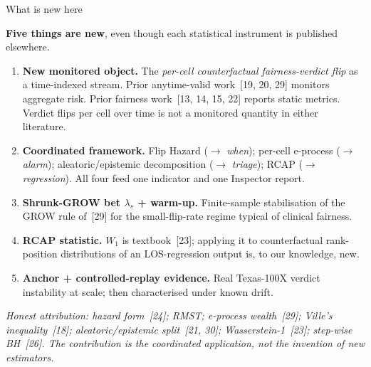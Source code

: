 \documentclass[aspectratio=169,11pt]{beamer}
\begin{document}
\begin{frame}{What is new here}
\vspace{-4pt}
\begin{teabox}[colframe=emerald]
\textbf{\color{emerald}\enspace Five things are new}, even though each statistical instrument is published elsewhere.
\end{teabox}
\vspace{-2pt}
\footnotesize
\begin{enumerate}\setlength\itemsep{1pt}
\item \textbf{New monitored object.} The \emph{per-cell counterfactual fairness-verdict flip} as a time-indexed stream. Prior anytime-valid work~[19, 20, 29] monitors aggregate risk. Prior fairness work~[13, 14, 15, 22] reports static metrics. Verdict flips per cell over time is not a monitored quantity in either literature.
\item \textbf{Coordinated framework.} Flip Hazard ($\rightarrow$ \emph{when}); per-cell e-process ($\rightarrow$ \emph{alarm}); aleatoric/epistemic decomposition ($\rightarrow$ \emph{triage}); RCAP ($\rightarrow$ \emph{regression}). All four feed one indicator and one Inspector report.
\item \textbf{Shrunk-GROW bet $\lambda_s$ + warm-up.} Finite-sample stabilisation of the GROW rule of~[29] for the small-flip-rate regime typical of clinical fairness.
\item \textbf{RCAP statistic.} $W_1$ is textbook~[23]; applying it to counterfactual rank-position distributions of an LOS-regression output is, to our knowledge, new.
\item \textbf{Anchor + controlled-replay evidence.} Real Texas-100X verdict instability at scale; then characterised under known drift.
\end{enumerate}
\vspace{-2pt}
{\scriptsize\color{muted}\itshape Honest attribution: hazard form~[24]; RMST; e-process wealth~[29]; Ville's inequality~[18]; aleatoric/epistemic split~[21, 30]; Wasserstein-1~[23]; step-wise BH~[26]. The contribution is the coordinated application, not the invention of new estimators.}
\end{frame}
\end{document}

